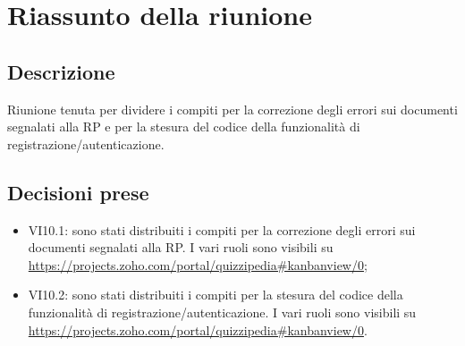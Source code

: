 \section{Riassunto della riunione}
\subsection{Descrizione}

Riunione tenuta per dividere i compiti per la correzione degli errori sui documenti segnalati alla RP e per la stesura del codice della funzionalità di registrazione/autenticazione.

\subsection{Decisioni prese}
\begin{itemize}
\item VI10.1: sono stati distribuiti i compiti per la correzione degli errori sui documenti segnalati alla RP. I vari ruoli sono visibili su \url{https://projects.zoho.com/portal/quizzipedia#kanbanview/0};
\item VI10.2: sono stati distribuiti i compiti per la  stesura del codice della funzionalità di registrazione/autenticazione. I vari ruoli sono visibili su \url{https://projects.zoho.com/portal/quizzipedia#kanbanview/0}.
\end{itemize}
